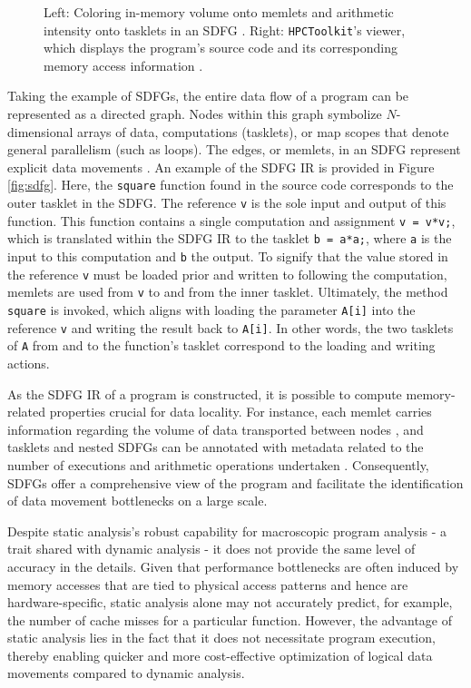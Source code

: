 \begin{figure}
\begin{subfigure}[c]{.68\textwidth}
	\end{subfigure}
	\caption{Left: Coloring in-memory volume onto memlets and arithmetic intensity onto tasklets in an SDFG \cite{schaad2021boosting}. Right: \texttt{HPCToolkit}'s viewer, which displays the program's source code and its corresponding memory access information \cite{adhianto2010hpctoolkit}.}
	\label{fig:coarse}
\end{figure}

Taking the example of SDFGs, the entire data flow of a program can be represented as a directed graph. Nodes within this graph symbolize $N$-dimensional arrays of data, computations (tasklets), or map scopes that denote general parallelism (such as loops). The edges, or memlets, in an SDFG represent explicit data movements \cite{ben2019statefulSDFG}. An example of the SDFG IR is provided in Figure \ref{fig:sdfg}. Here, the \texttt{square} function found in the source code corresponds to the outer tasklet in the SDFG. The reference \texttt{v} is the sole input and output of this function. This function contains a single computation and assignment \texttt{v = v*v;}, which is translated within the SDFG IR to the tasklet \texttt{b = a*a;}, where \texttt{a} is the input to this computation and \texttt{b} the output. To signify that the value stored in the reference \texttt{v} must be loaded prior and written to following the computation, memlets are used from \texttt{v} to and from the inner tasklet. Ultimately, the method \texttt{square} is invoked, which aligns with loading the parameter \texttt{A[i]} into the reference \texttt{v} and writing the result back to \texttt{A[i]}. In other words, the two tasklets of \texttt{A} from and to the function's tasklet correspond to the loading and writing actions.

As the SDFG IR of a program is constructed, it is possible to compute memory-related properties crucial for data locality. For instance, each memlet carries information regarding the volume of data transported between nodes \cite{ben2019statefulSDFG}, and tasklets and nested SDFGs can be annotated with metadata related to the number of executions and arithmetic operations undertaken \cite{schaad2021boosting}. Consequently, SDFGs offer a comprehensive view of the program and facilitate the identification of data movement bottlenecks on a large scale.

Despite static analysis's robust capability for macroscopic program analysis - a trait shared with dynamic analysis - it does not provide the same level of accuracy in the details. Given that performance bottlenecks are often induced by memory accesses that are tied to physical access patterns and hence are hardware-specific, static analysis alone may not accurately predict, for example, the number of cache misses for a particular function. However, the advantage of static analysis lies in the fact that it does not necessitate program execution, thereby enabling quicker and more cost-effective optimization of logical data movements compared to dynamic analysis.

